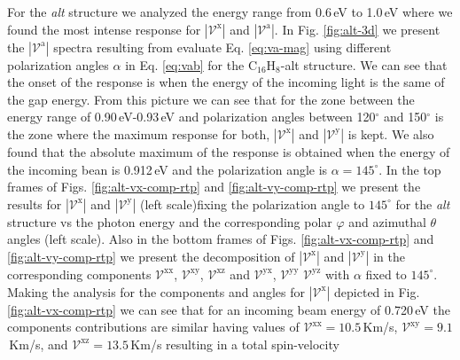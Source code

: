\documentclass[prb,11pt,tightenlines,twocolumn,aps]{revtex4-1}
\begin{document}
For the \emph{alt} structure we analyzed the energy range from 0.6\,eV to
1.0\,eV where we found the most intense response for 
$|\mathcal{V}^{\mathrm{x}}|$ and $|\mathcal{V}^{\mathrm{a}}|$. In Fig. 
\ref{fig:alt-3d} we present the $|\mathcal{V}^{\mathrm{a}}|$ spectra resulting 
from evaluate Eq. \eqref{eq:va-mag} using different polarization angles $\alpha$
in Eq. \eqref{eq:vab} for the C$_{16}$H$_{8}$-alt structure. We can see that the
onset of the response is when the energy of the incoming light is the same of
the gap energy.
%
From this picture we can see that for the zone between the energy range of
0.90\,eV-0.93\,eV and polarization angles between 120$^{\circ}$ and
150$^{\circ}$ is the zone where the maximum response for both,
$|\mathcal{V}^{\mathrm{x}}|$ and $|\mathcal{V}^{\mathrm{y}}|$ is kept.
We also found that the absolute maximum of the response is obtained when the
energy of the incoming bean is 0.912\,eV and the polarization angle is $\alpha =
145^{\circ}$. In the top frames of Figs. \ref{fig:alt-vx-comp-rtp}  and 
%
\ref{fig:alt-vy-comp-rtp} we present the results for
$|\mathcal{V}^{\mathrm{x}}|$ and $|\mathcal{V}^{\mathrm{y}}|$ (left scale)fixing
the polarization angle to $145^{\circ}$ for the \emph{alt} structure vs the
photon energy and the corresponding polar $\varphi$ and azimuthal $\theta$
angles (left scale). Also in the bottom frames of Figs. 
\ref{fig:alt-vx-comp-rtp} and
\ref{fig:alt-vy-comp-rtp} we present the decomposition of
$|\mathcal{V}^{\mathrm{x}}|$ and 
$|\mathcal{V}^{\mathrm{y}}|$ 
in the corresponding components
$\mathcal{V}^{\mathrm{xx}}$, 
$\mathcal{V}^{\mathrm{xy}}$,
$\mathcal{V}^{\mathrm{xz}}$ and
$\mathcal{V}^{\mathrm{yx}}$,
$\mathcal{V}^{\mathrm{yy}}$
$\mathcal{V}^{\mathrm{yz}}$ 
with $\alpha$ fixed to $145^{\circ}$.
Making the analysis for the components and angles for
$|\mathcal{V}^{\mathrm{x}}|$ depicted in Fig. \ref{fig:alt-vx-comp-rtp} we can
see that for an incoming beam energy of 0.720\,eV the components contributions 
are similar having values of
%
$\mathcal{V}^{\mathrm{xx}}= 10.5$\,Km/s, 
$\mathcal{V}^{\mathrm{xy}}=  9.1$\,Km/s, and
$\mathcal{V}^{\mathrm{xz}}= 13.5$\,Km/s
% 
resulting in a total spin-velocity 
\end{document}
